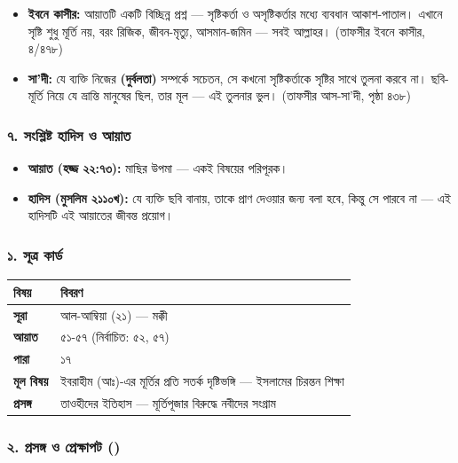\begin{itemize}
\item \textbf{ইবনে কাসীর:} আয়াতটি একটি বিচ্ছিন্ন প্রশ্ন — সৃষ্টিকর্তা ও অসৃষ্টিকর্তার মধ্যে ব্যবধান আকাশ-পাতাল। এখানে সৃষ্টি শুধু মূর্তি নয়, বরং রিজিক, জীবন-মৃত্যু, আসমান-জমিন — সবই আল্লাহর। (তাফসীর ইবনে কাসীর, ৪/৪৭৮)
\item \textbf{সা'দী:} যে ব্যক্তি নিজের \textbf{ (দুর্বলতা)} সম্পর্কে সচেতন, সে কখনো সৃষ্টিকর্তাকে সৃষ্টির সাথে তুলনা করবে না। ছবি-মূর্তি নিয়ে যে ভ্রান্তি মানুষের ছিল, তার মূল — এই তুলনার ভুল। (তাফসীর আস-সা'দী, পৃষ্ঠা ৪৩৮)
\end{itemize}
\subsubsection*{৭. সংশ্লিষ্ট হাদিস ও আয়াত}

\begin{itemize}
\item \textbf{আয়াত (হজ্জ ২২:৭৩):} মাছির উপমা — একই বিষয়ের পরিপূরক।
\item \textbf{হাদিস (মুসলিম ২১১০খ):} যে ব্যক্তি ছবি বানায়, তাকে প্রাণ দেওয়ার জন্য বলা হবে, কিন্তু সে পারবে না — এই হাদিসটি এই আয়াতের জীবন্ত প্রয়োগ।
\end{itemize}
\subsubsection*{১. সূত্র কার্ড}

\begin{table}[h]\centering\small
\begin{tabular}{ll}
বিষয় & বিবরণ \\
\hline
\textbf{সূরা} & আল-আম্বিয়া (২১) — মক্কী \\
\textbf{আয়াত} & ৫১-৫৭ (নির্বাচিত: ৫২, ৫৭) \\
\textbf{পারা} & ১৭ \\
\textbf{মূল বিষয়} & ইবরাহীম (আঃ)-এর মূর্তির প্রতি সতর্ক দৃষ্টিভঙ্গি — ইসলামের চিরন্তন শিক্ষা \\
\textbf{প্রসঙ্গ} & তাওহীদের ইতিহাস — মূর্তিপূজার বিরুদ্ধে নবীদের সংগ্রাম \\
\hline
\end{tabular}
\end{table}

\subsubsection*{২. প্রসঙ্গ ও প্রেক্ষাপট ()}

